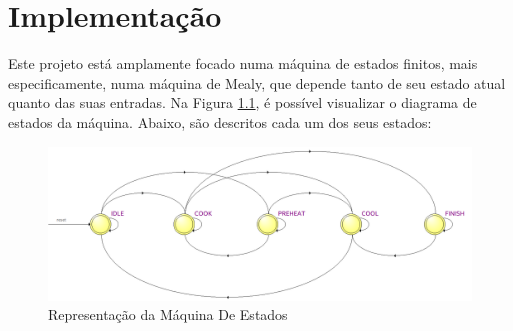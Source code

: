 \documentclass[a4paper, 11pt, onecolumn, oneside]{report}
\begin{document}
\chapter{Implementação}
\label{chap.arquitetura}
Este projeto está amplamente focado numa máquina de estados finitos, mais especificamente, numa máquina de Mealy, que depende tanto de seu estado atual quanto das suas entradas. Na Figura \ref{fig:fsm}, é possível visualizar o diagrama de estados da máquina. Abaixo, são descritos cada um dos seus estados: \\

\begin{figure}[H]
    \centering
    \includegraphics[width=\textwidth]{images/FSM.png}
    \caption{Representação da Máquina De Estados}
    \label{fig:fsm}
\end{figure}
\end{document}
